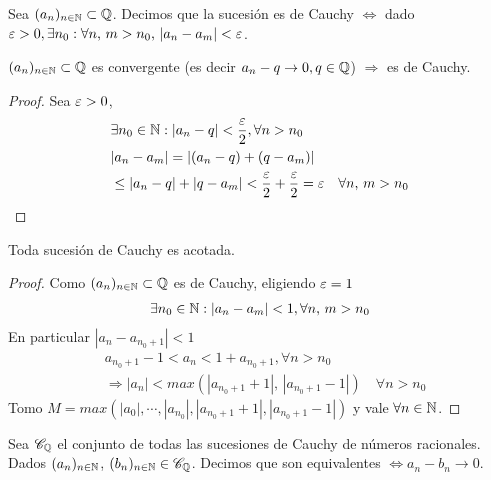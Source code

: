 \begin{definition}
  Sea \((a_n)_{n \in \mathbb{N}} \subset \mathbb{Q}\). Decimos que la sucesión es de Cauchy \(\iff\) dado \(\varepsilon > 0, \exists n_0 : \forall n\text{, }m > n_0\text{, } |a_n - a_m| < \varepsilon\).
\end{definition}

\begin{theorem}
  \((a_n)_{n \in \mathbb{N}} \subset \mathbb{Q}\) es convergente (es decir \(a_n - q \to 0, q \in \mathbb{Q}\)) \(\Rightarrow\) es de Cauchy.
  \begin{proof}
    Sea \(\varepsilon > 0\),
    \begin{align*}
       & \exists n_0 \in \mathbb{N} : |a_n - q| < \dfrac{\varepsilon}{2}, \forall n > n_0                                 \\
       & | a_n - a_m| = |(a_n - q) + (q - a_m)|                                                          \\
       & \leq |a_n - q| + |q - a_m| < \dfrac{\varepsilon}{2} + \dfrac{\varepsilon}{2} = \varepsilon \quad \forall n\text{, }m > n_0
    \end{align*}
  \end{proof}
\end{theorem}

\begin{theorem}
  Toda sucesión de Cauchy es acotada.
  \begin{proof}
    Como \((a_n)_{n \in \mathbb{N}} \subset \mathbb{Q}\) es de Cauchy, eligiendo \(\varepsilon = 1\) \begin{align*}
      \exists n_0 \in \mathbb{N} : |a_n - a_m| < 1, \forall n\text{, }m > n_0
    \end{align*}
    En particular \(|a_n - a_{n_0+1}| < 1\)
    \begin{align*}
       & a_{n_0+1} - 1 < a_n < 1 + a_{n_0+1}, \forall n > n_0                                    \\
       & \Rightarrow |a_n| < max(|a_{n_0+1} + 1|\text{, } |a_{n_0+1} - 1|) \quad \forall n > n_0
    \end{align*}
    Tomo \(M = max(|a_0|, \cdots, |a_{n_0}|, |a_{n_0+1} + 1|, |a_{n_0+1} - 1|)\) y vale \(\forall n \in \mathbb{N}\).
  \end{proof}
\end{theorem}

\begin{definition}
  Sea \(\mathscr{C}_{\mathbb{Q}}\) el conjunto de todas las sucesiones de Cauchy de números racionales. Dados \((a_n)_{n \in \mathbb{N}}\), \((b_n)_{n \in \mathbb{N}} \in \mathscr{C}_{\mathbb{Q}}\). Decimos que son equivalentes \(\iff a_n - b_n \to 0\).
\end{definition}

